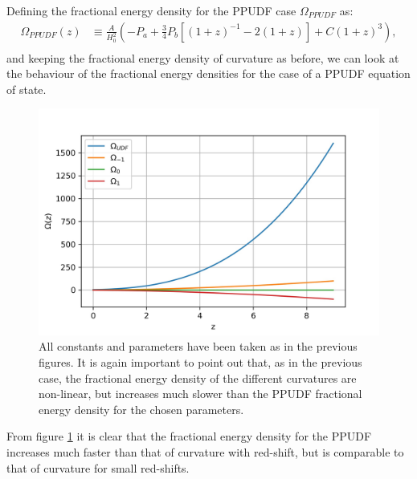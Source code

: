 \documentclass[a4paper, 11pt]{FSKH_623_Report}
\numberwithin{equation}{section}
\newcommand{\brac}[1]{\left(#1\right)}
\newcommand{\bracc}[1]{\left[#1\right]}
\begin{document}
Defining the fractional energy density for the PPUDF case $\Omega_{PPUDF}$ as:
\begin{equation}\label{eq:UDFOmega}
\begin{split}
\Omega_{PPUDF}(z) &\equiv \frac{A}{H_{0}^{2}}\brac{-P_{a}+\frac{3}{4}P_{b}\bracc{\brac{1+z}^{-1}-2\brac{1+z}}+C\brac{1+z}^{3}},       \\
\end{split}
\end{equation}
and keeping the fractional energy density of curvature as before, we can look at the behaviour of the fractional energy densities for the case of a PPUDF equation of state.
\begin{figure}[H]
\centering
\includegraphics[scale=1]{Figures/UDF_Om.jpg}
\caption{All constants and parameters have been taken as in the previous figures. It is again important to point out that, as in the previous case, the fractional energy density of the different curvatures are non-linear, but increases much slower than the PPUDF fractional energy density for the chosen parameters.}
\label{fig:UDFOmega}
\end{figure}
From figure \ref{fig:UDFOmega} it is clear that the fractional energy density for the PPUDF increases much faster than that of curvature with red-shift, but is comparable to that of curvature for small red-shifts. 
\end{document}
